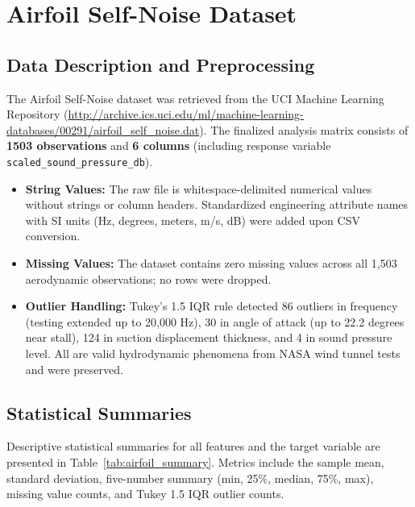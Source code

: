 \documentclass[11pt]{article}
\begin{document}
\section{Airfoil Self-Noise Dataset}

\subsection{Data Description and Preprocessing}
The Airfoil Self-Noise dataset was retrieved from the UCI Machine Learning Repository (\url{http://archive.ics.uci.edu/ml/machine-learning-databases/00291/airfoil_self_noise.dat}). The finalized analysis matrix consists of \textbf{1503 observations} and \textbf{6 columns} (including response variable \texttt{scaled\_sound\_pressure\_db}).

\begin{itemize}
    \item \textbf{String Values:} The raw file is whitespace-delimited numerical values without strings or column headers. Standardized engineering attribute names with SI units (Hz, degrees, meters, m/s, dB) were added upon CSV conversion.
    \item \textbf{Missing Values:} The dataset contains zero missing values across all 1,503 aerodynamic observations; no rows were dropped.
    \item \textbf{Outlier Handling:} Tukey's 1.5 IQR rule detected 86 outliers in frequency (testing extended up to 20,000 Hz), 30 in angle of attack (up to 22.2 degrees near stall), 124 in suction displacement thickness, and 4 in sound pressure level. All are valid hydrodynamic phenomena from NASA wind tunnel tests and were preserved.
\end{itemize}

\subsection{Statistical Summaries}
Descriptive statistical summaries for all features and the target variable are presented in Table~\ref{tab:airfoil_summary}. Metrics include the sample mean, standard deviation, five-number summary (min, 25\%, median, 75\%, max), missing value counts, and Tukey 1.5 IQR outlier counts.
\end{document}

